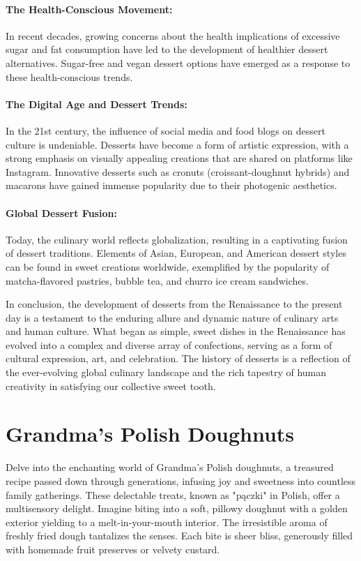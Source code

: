 \paragraph{The Health-Conscious Movement:} In recent decades, growing concerns about the health implications of excessive sugar and fat consumption have led to the development of healthier dessert alternatives. Sugar-free and vegan dessert options have emerged as a response to these health-conscious trends.

\paragraph{The Digital Age and Dessert Trends:} In the 21st century, the influence of social media and food blogs on dessert culture is undeniable. Desserts have become a form of artistic expression, with a strong emphasis on visually appealing creations that are shared on platforms like Instagram. Innovative desserts such as cronuts (croissant-doughnut hybrids) and macarons have gained immense popularity due to their photogenic aesthetics.

\paragraph{Global Dessert Fusion:} Today, the culinary world reflects globalization, resulting in a captivating fusion of dessert traditions. Elements of Asian, European, and American dessert styles can be found in sweet creations worldwide, exemplified by the popularity of matcha-flavored pastries, bubble tea, and churro ice cream sandwiches.

In conclusion, the development of desserts from the Renaissance to the present day is a testament to the enduring allure and dynamic nature of culinary arts and human culture. What began as simple, sweet dishes in the Renaissance has evolved into a complex and diverse array of confections, serving as a form of cultural expression, art, and celebration. The history of desserts is a reflection of the ever-evolving global culinary landscape and the rich tapestry of human creativity in satisfying our collective sweet tooth.

\section{Grandma's Polish Doughnuts}
\label{grandmaspolishdoughnuts}
Delve into the enchanting world of Grandma's Polish doughnuts, a treasured recipe passed down through generations, infusing joy and sweetness into countless family gatherings. These delectable treats, known as "pączki" in Polish, offer a multisensory delight. Imagine biting into a soft, pillowy doughnut with a golden exterior yielding to a melt-in-your-mouth interior. The irresistible aroma of freshly fried dough tantalizes the senses. Each bite is sheer bliss, generously filled with homemade fruit preserves or velvety custard.

